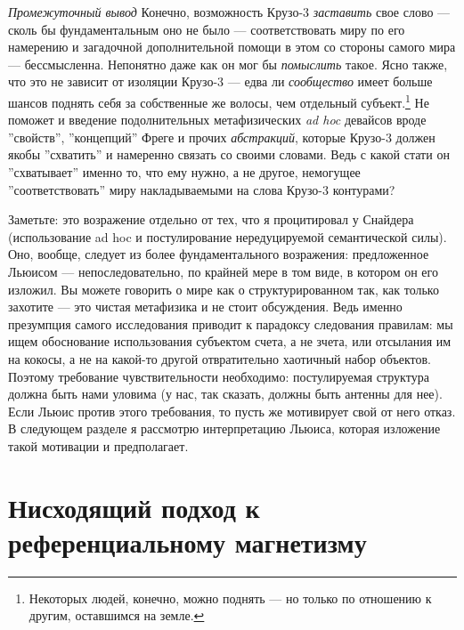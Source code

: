 \documentclass[11pt]{book}
\begin{document}
\textit{Промежуточный вывод} \quad Конечно, возможность Крузо-3 \textit{заставить} свое слово --- сколь бы фундаментальным оно не было --- соответствовать миру по его намерению и загадочной дополнительной помощи в этом со стороны самого мира --- бессмысленна. Непонятно даже как он мог бы \textit{помыслить} такое. Ясно также, что это не зависит от изоляции Крузо-3 --- едва ли \textit{сообщество} имеет больше шансов поднять себя за собственные же волосы, чем отдельный субъект.\footnote{Некоторых людей, конечно, можно поднять --- но только по отношению к другим, оставшимся на земле.} Не поможет и введение подолнительных метафизических \textit{ad hoc} девайсов вроде ''свойств'', ''концепций'' Фреге и прочих \textit{абстракций}, которые Крузо-3 должен якобы ''схватить'' и намеренно связать со своими словами. Ведь с какой стати он ''схватывает'' именно то, что ему нужно, а не другое, немогущее ''соответствовать'' миру накладываемыми на слова Крузо-3 контурами?

Заметьте: это возражение отдельно от тех, что я процитировал у Снайдера (использование ad hoc и постулирование нередуцируемой семантической силы). Оно, вообще, следует из более фундаментального возражения: предложенное Льюисом --- непоследовательно, по крайней мере в том виде, в котором он его изложил. Вы можете говорить о мире как о структурированном так, как только захотите --- это чистая метафизика и не стоит обсуждения. Ведь именно презумпция самого исследования приводит к парадоксу следования правилам: мы ищем обоснование использования субъектом счета, а не зчета, или отсылания им на кокосы, а не на какой-то другой отвратительно хаотичный набор объектов. Поэтому требование чувствительности необходимо: постулируемая структура должна быть нами уловима (у нас, так сказать, должны быть антенны для нее). Если Льюис против этого требования, то пусть же мотивирует свой от него отказ. В следующем разделе я рассмотрю интерпретацию Льюиса, которая изложение такой мотивации и предполагает.

\section{Нисходящий подход к референциальному магнетизму}
\end{document}
